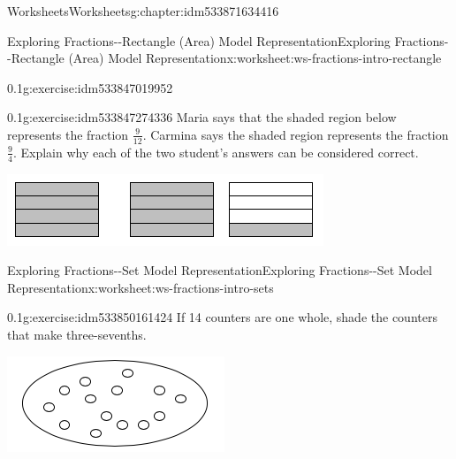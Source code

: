 \documentclass[twoside,11pt,]{book}
\begin{document}
\begin{chapterptx}{Worksheets}{}{Worksheets}{}{}{g:chapter:idm533871634416}
\begin{worksheet-section-numberless}{Exploring Fractions-{}-{}Rectangle (Area) Model Representation}{}{Exploring Fractions-{}-{}Rectangle (Area) Model Representation}{}{}{x:worksheet:ws-fractions-intro-rectangle}
\begin{divisionexercise}{4}{}{0.1}{g:exercise:idm533847019952}
\begin{sidebyside}{1}{0.3}{0.3}{0}
\begin{sbspanel}{0.4}
\end{sbspanel}%
\end{sidebyside}%
%
\end{divisionexercise}%
\begin{divisionexercise}{5}{}{0.1}{g:exercise:idm533847274336}%
Maria says that the shaded region below represents the fraction \(\frac{9}{12} \). Carmina says the shaded region represents the fraction \(\frac{9}{4} \). Explain why each of the two student’s answers can be considered correct. \begin{sidebyside}{1}{0.25}{0.25}{0}%
\begin{sbspanel}{0.5}%
\includegraphics[width=1\linewidth]{images/nine-fourths-vs-twelfths.png}
\end{sbspanel}%
\end{sidebyside}%
%
\end{divisionexercise}%
\end{worksheet-section-numberless}
\restoregeometry
%
%
\typeout{************************************************}
\typeout{************************************************}
%
\begin{worksheet-section-numberless}{Exploring Fractions-{}-{}Set Model Representation}{}{Exploring Fractions-{}-{}Set Model Representation}{}{}{x:worksheet:ws-fractions-intro-sets}
\begin{divisionexercise}{1}{}{0.1}{g:exercise:idm533850161424}%
If 14 counters are one whole, shade the counters that make three-sevenths. \begin{sidebyside}{1}{0.35}{0.35}{0}%
\begin{sbspanel}{0.3}%
\includegraphics[width=1\linewidth]{images/fourteen-counters.png}

\end{sbspanel}
\end{sidebyside}
\end{divisionexercise}
\end{worksheet-section-numberless}
\end{chapterptx}
\end{document}
